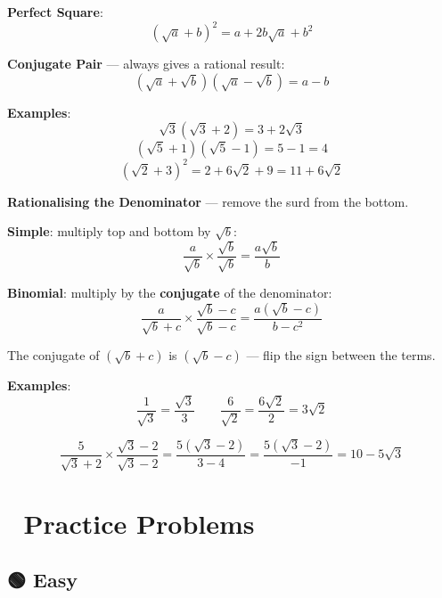 \documentclass[
  letterpaper,
  DIV=11,
  numbers=noendperiod]{scrreprt}
\theoremstyle{definition}
\theoremstyle{remark}
\begin{document}
\textbf{Perfect Square}: \[(\sqrt{a} + b)^2 = a + 2b\sqrt{a} + b^2\]

\textbf{Conjugate Pair} --- always gives a rational result:
\[(\sqrt{a} + \sqrt{b})(\sqrt{a} - \sqrt{b}) = a - b\]

\textbf{Examples}: \[\sqrt{3}(\sqrt{3}+2) = 3 + 2\sqrt{3}\]
\[(\sqrt{5}+1)(\sqrt{5}-1) = 5-1 = 4\]
\[(\sqrt{2}+3)^2 = 2 + 6\sqrt{2} + 9 = 11 + 6\sqrt{2}\]

\textbf{Rationalising the Denominator} --- remove the surd from the
bottom.

\textbf{Simple}: multiply top and bottom by \(\sqrt{b}\):
\[\frac{a}{\sqrt{b}} \times \frac{\sqrt{b}}{\sqrt{b}} = \frac{a\sqrt{b}}{b}\]

\textbf{Binomial}: multiply by the \textbf{conjugate} of the
denominator:
\[\frac{a}{\sqrt{b}+c} \times \frac{\sqrt{b}-c}{\sqrt{b}-c} = \frac{a(\sqrt{b}-c)}{b-c^2}\]

The conjugate of \((\sqrt{b}+c)\) is \((\sqrt{b}-c)\) --- flip the sign
between the terms.

\textbf{Examples}:
\[\frac{1}{\sqrt{3}} = \frac{\sqrt{3}}{3} \qquad \frac{6}{\sqrt{2}} = \frac{6\sqrt{2}}{2} = 3\sqrt{2}\]

\[\frac{5}{\sqrt{3}+2} \times \frac{\sqrt{3}-2}{\sqrt{3}-2} = \frac{5(\sqrt{3}-2)}{3-4} = \frac{5(\sqrt{3}-2)}{-1} = 10-5\sqrt{3}\]

\section{📝 Practice Problems}\label{practice-problems-1}

\subsection{🟢 Easy}
\end{document}
